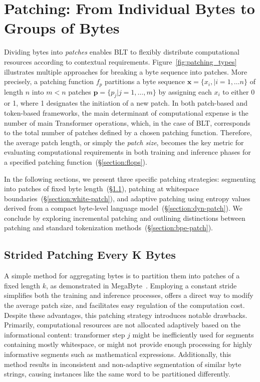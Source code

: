 \section{Patching: From Individual Bytes to Groups of Bytes}
\label{section:patching}

Dividing bytes into \textit{patches} enables {\textsc BLT} to flexibly distribute computational resources according to contextual requirements. Figure~\ref{fig:patching_types} illustrates multiple approaches for breaking a byte sequence into patches. More precisely, a patching function $f_p$ partitions a byte sequence $\pmb{x}=\{x_i,|i=1,\ldots n\}$ of length $n$ into $m < n$ patches $\pmb{p}=\{p_j|j=1,\ldots,m\}$ by assigning each $x_i$ to either 0 or 1, where 1 designates the initiation of a new patch. In both patch-based and token-based frameworks, the main determinant of computational expense is the number of main Transformer operations, which, in the case of {\textsc BLT}, corresponds to the total number of patches defined by a chosen patching function. Therefore, the average patch length, or simply the \textit{patch size}, becomes the key metric for evaluating computational requirements in both training and inference phases for a specified patching function~(\S\ref{section:flops}).

In the following sections, we present three specific patching strategies: segmenting into patches of fixed byte length~(\S\ref{section:static-patch}), patching at whitespace boundaries~(\S\ref{section:white-patch}), and adaptive patching using entropy values derived from a compact byte-level language model~(\S\ref{section:dyn-patch}). We conclude by exploring incremental patching and outlining distinctions between patching and standard tokenization methods~(\S\ref{section:bpe-patch}).

\subsection{Strided Patching Every K Bytes}
\label{section:static-patch}

A simple method for aggregating bytes is to partition them into patches of a fixed length $k$, as demonstrated in MegaByte~\citep{yu2023megabyte}. Employing a constant stride simplifies both the training and inference processes, offers a direct way to modify the average patch size, and facilitates easy regulation of the computation cost. Despite these advantages, this patching strategy introduces notable drawbacks. Primarily, computational resources are not allocated adaptively based on the informational content: transformer step $j$ might be inefficiently used for segments containing mostly whitespace, or might not provide enough processing for highly informative segments such as mathematical expressions. Additionally, this method results in inconsistent and non-adaptive segmentation of similar byte strings, causing instances like the same word to be partitioned differently.

